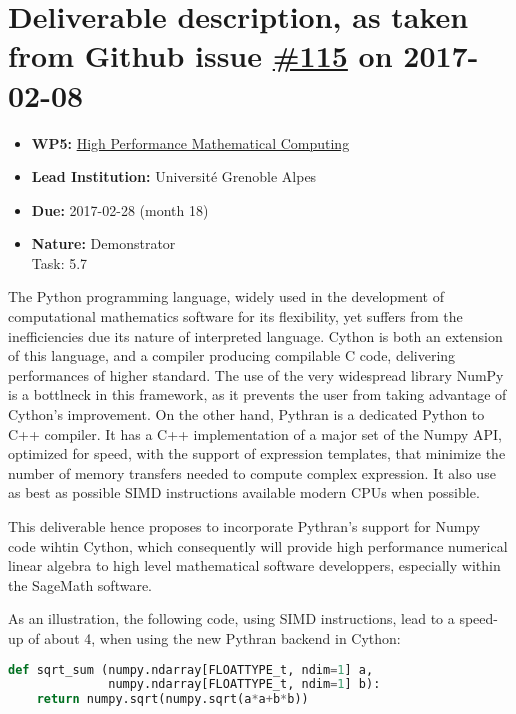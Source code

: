 \section*{\texorpdfstring{Deliverable description, as taken from Github
issue
\href{https://github.com/OpenDreamKit/OpenDreamKit/issues/115}{\#115} on
2017-02-08}{Deliverable description, as taken from Github issue \#115 on 2017-02-08}}\label{deliverable-description-as-taken-from-github-issue-115-on-2017-02-08}

\begin{itemize}
\tightlist
\item
  \textbf{WP5:}
  \href{https://github.com/OpenDreamKit/OpenDreamKit/tree/master/WP5}{High
  Performance Mathematical Computing}
\item
  \textbf{Lead Institution:} Université Grenoble Alpes
\item
  \textbf{Due:} 2017-02-28 (month 18)
\item
  \textbf{Nature:} Demonstrator\\
  Task: 5.7
\end{itemize}


The Python programming language, widely used in the development of
computational mathematics software for its flexibility, yet suffers from the
inefficiencies due its nature of interpreted language. Cython is both an extension of
this language, and a compiler producing compilable C code, delivering
performances of higher standard.
The use of the very widespread library NumPy is a bottlneck in this framework,
as it prevents the user from taking advantage of Cython's improvement.
On the other hand, Pythran is a dedicated Python to C++ compiler. It has a C++
implementation of a major set of the Numpy API, optimized for speed, with the
support of expression templates, that minimize the number of memory transfers
needed to compute complex expression. It also use as best as possible SIMD instructions available modern CPUs when possible.

This deliverable hence proposes to incorporate Pythran's support for Numpy code
wihtin Cython, which consequently will provide high performance numerical linear
algebra to high level mathematical software developpers, especially within the
SageMath software.

As an illustration, the following code, using SIMD instructions, lead to a
speed-up of about 4, when using the new Pythran backend in Cython:
\begin{lstlisting}[language=python]
def sqrt_sum (numpy.ndarray[FLOATTYPE_t, ndim=1] a,
              numpy.ndarray[FLOATTYPE_t, ndim=1] b):
    return numpy.sqrt(numpy.sqrt(a*a+b*b))
\end{lstlisting}
